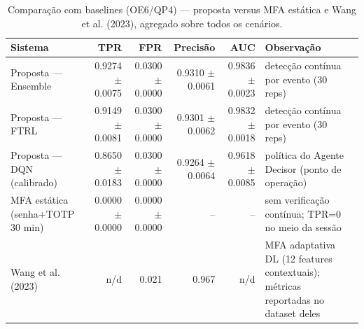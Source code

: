\begin{table}[htbp]
\centering
\caption{Comparação com baselines (OE6/QP4) — proposta versus MFA estática e Wang et al. (2023), agregado sobre todos os cenários.}
\label{tab:8-baseline}
\begin{tabular}{lrrrrll}
\toprule
Sistema & TPR & FPR & Precis\~ao & AUC & Observa\c c\~ao \\
\midrule
Proposta --- Ensemble & 0.9274 $\pm$ 0.0075 & 0.0300 $\pm$ 0.0000 & 0.9310 $\pm$ 0.0061 & 0.9836 $\pm$ 0.0023 & detec\c c\~ao cont\'inua por evento (30 reps) \\
Proposta --- FTRL & 0.9149 $\pm$ 0.0081 & 0.0300 $\pm$ 0.0000 & 0.9301 $\pm$ 0.0062 & 0.9832 $\pm$ 0.0018 & detec\c c\~ao cont\'inua por evento (30 reps) \\
Proposta --- DQN (calibrado) & 0.8650 $\pm$ 0.0183 & 0.0300 $\pm$ 0.0000 & 0.9264 $\pm$ 0.0064 & 0.9618 $\pm$ 0.0085 & pol\'itica do Agente Decisor (ponto de opera\c c\~ao) \\
MFA est\'atica (senha+TOTP 30 min) & 0.0000 $\pm$ 0.0000 & 0.0000 $\pm$ 0.0000 & -- & -- & sem verifica\c c\~ao cont\'inua; TPR=0 no meio da sess\~ao \\
Wang et al. (2023) & n/d & 0.021 & 0.967 & n/d & MFA adaptativa DL (12 features contextuais); m\'etricas reportadas no dataset deles \\
\bottomrule
\end{tabular}
\end{table}

